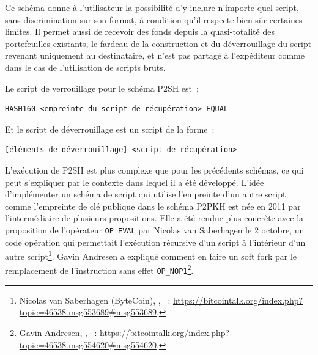 
Ce schéma donne à l'utilisateur la possibilité d'y inclure n'importe quel script, sans discrimination sur son format, à condition qu'il respecte bien sûr certaines limites. Il permet aussi de recevoir des fonds depuis la quasi-totalité des portefeuilles existants, le fardeau de la construction et du déverrouillage du script revenant uniquement au destinataire, et n'est pas partagé à l'expéditeur comme dans le cas de l'utilisation de scripts bruts.

Le script de verrouillage pour le schéma P2SH est~:

\begin{Verbatim}[fontsize=\footnotesize]
HASH160 <empreinte du script de récupération> EQUAL
\end{Verbatim}

Et le script de déverrouillage est un script de la forme~:

\begin{Verbatim}[fontsize=\footnotesize]
[éléments de déverrouillage] <script de récupération>
\end{Verbatim}

L'exécution de P2SH est plus complexe que pour les précédents schémas, ce qui peut s'expliquer par le contexte dans lequel il a été développé. L'idée d'implémenter un schéma de script qui utilise l'empreinte d'un autre script comme l'empreinte de clé publique dans le schéma P2PKH est née en 2011 par l'intermédiaire de plusieurs propositions. Elle a été rendue plus concrète avec la proposition de l'opérateur \texttt{OP\_EVAL} par Nicolas van Saberhagen le 2 octobre, un code opération qui permettait l'exécution récursive d'un script à l'intérieur d'un autre script\footnote{Nicolas van Saberhagen (ByteCoin), , ~: \url{https://bitcointalk.org/index.php?topic=46538.msg553689\#msg553689}.}. Gavin Andresen a expliqué comment en faire un soft fork par le remplacement de l'instruction sans effet \texttt{OP\_NOP1}\footnote{Gavin Andresen, , ~: \url{https://bitcointalk.org/index.php?topic=46538.msg554620\#msg554620}.}.

